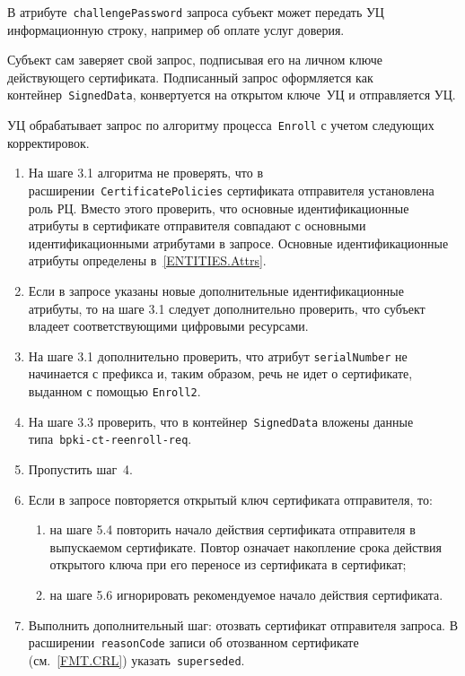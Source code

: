 В атрибуте~\texttt{challengePassword} запроса субъект может передать УЦ 
информационную строку, например об оплате услуг доверия.

Субъект сам заверяет свой запрос, подписывая его на личном ключе 
действующего сертификата. Подписанный запрос оформляется как 
контейнер~\texttt{SignedData}, конвертуется на открытом ключе~УЦ
и отправляется УЦ.

УЦ обрабатывает запрос по алгоритму процесса~\texttt{Enroll}
с учетом следующих корректировок.
\begin{enumerate}
\item
На шаге 3.1 алгоритма не проверять, что в
расширении~\texttt{CertificatePolicies} сертификата отправителя установлена
роль РЦ. Вместо этого проверить, что основные идентификационные атрибуты
в сертификате отправителя совпадают с основными идентификационными
атрибутами в запросе. Основные идентификационные атрибуты определены
в~\ref{ENTITIES.Attrs}.

\item
Если в запросе указаны новые дополнительные идентификационные атрибуты,
то на шаге 3.1 следует дополнительно проверить, что субъект 
владеет соответствующими цифровыми ресурсами. 

\item
На шаге 3.1 дополнительно проверить, что атрибут \texttt{serialNumber}
не начинается с префикса  и, таким образом,
речь не идет о сертификате, выданном с помощью \texttt{Enroll2}.
 
\item
На шаге 3.3 проверить, что в контейнер~\texttt{SignedData} вложены данные 
типа~\texttt{bpki-ct-reenroll-req}. 

\item
Пропустить шаг~4.

\item
Если в запросе повторяется открытый ключ сертификата отправителя, то:
\begin{enumerate}
\item
на шаге 5.4 повторить начало действия сертификата отправителя в выпускаемом 
сертификате. Повтор означает накопление срока действия открытого ключа 
при его переносе из сертификата в сертификат; 

%

\item
на шаге 5.6 игнорировать рекомендуемое начало действия сертификата.
\end{enumerate}

\item
Выполнить дополнительный шаг: отозвать сертификат отправителя запроса.
%
В расширении~\texttt{reasonCode} записи об отозванном сертификате 
(см.~\ref{FMT.CRL}) указать~\texttt{superseded}.
\end{enumerate}

